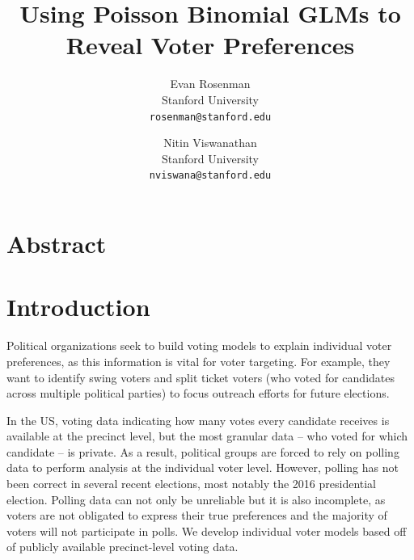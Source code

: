 \documentclass[10pt, letterpaper]{article}
\begin{document}
\title{Using Poisson Binomial GLMs to Reveal Voter Preferences}

\author{Evan Rosenman\\
Stanford University\\
{\tt\small rosenman@stanford.edu}
\and
Nitin Viswanathan\\
Stanford University\\
{\tt\small nviswana@stanford.edu}
}

\maketitle



\section{Abstract}

\section{Introduction}
Political organizations seek to build voting models to explain individual voter preferences, as this information is vital for voter targeting. For example, they want to identify swing voters and split ticket voters (who voted for candidates across multiple political parties) to focus outreach efforts for future elections.

In the US, voting data indicating how many votes every candidate receives is available at the precinct level, but the most granular data – who voted for which candidate – is private. As a result, political groups are forced to rely on polling data to perform analysis at the individual voter level. However, polling has not been correct in several recent elections, most notably the 2016 presidential election. Polling data can not only be unreliable but it is also incomplete, as voters are not obligated to express their true preferences and the majority of voters will not participate in polls. We develop individual voter models based off of publicly available precinct-level voting data.
\end{document}
